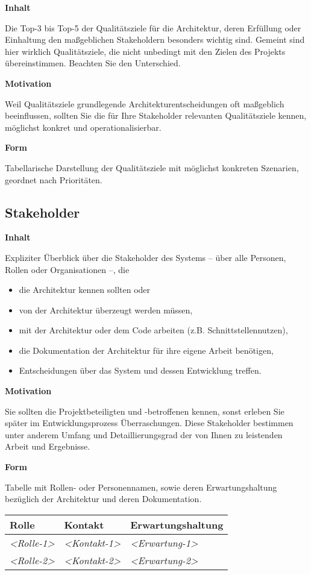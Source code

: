 \textbf{Inhalt}

Die Top-3 bis Top-5 der Qualitätsziele für die Architektur, deren
Erfüllung oder Einhaltung den maßgeblichen Stakeholdern besonders
wichtig sind. Gemeint sind hier wirklich Qualitätsziele, die nicht
unbedingt mit den Zielen des Projekts übereinstimmen. Beachten Sie den
Unterschied.

\textbf{Motivation}

Weil Qualitätsziele grundlegende Architekturentscheidungen oft
maßgeblich beeinflussen, sollten Sie die für Ihre Stakeholder relevanten
Qualitätsziele kennen, möglichst konkret und operationalisierbar.

\textbf{Form}

Tabellarische Darstellung der Qualitätsziele mit möglichst konkreten
Szenarien, geordnet nach Prioritäten.

\hypertarget{stakeholder}{%
\subsection{Stakeholder}\label{stakeholder}}

\textbf{Inhalt}

Expliziter Überblick über die Stakeholder des Systems -- über alle
Personen, Rollen oder Organisationen --, die

\begin{itemize}
\tightlist
\item
  die Architektur kennen sollten oder
\item
  von der Architektur überzeugt werden müssen,
\item
  mit der Architektur oder dem Code arbeiten (z.B.
  Schnittstellennutzen),
\item
  die Dokumentation der Architektur für ihre eigene Arbeit benötigen,
\item
  Entscheidungen über das System und dessen Entwicklung treffen.
\end{itemize}

\textbf{Motivation}

Sie sollten die Projektbeteiligten und -betroffenen kennen, sonst
erleben Sie später im Entwicklungsprozess Überraschungen. Diese
Stakeholder bestimmen unter anderem Umfang und Detaillierungsgrad der
von Ihnen zu leistenden Arbeit und Ergebnisse.

\textbf{Form}

Tabelle mit Rollen- oder Personennamen, sowie deren Erwartungshaltung
bezüglich der Architektur und deren Dokumentation.

\begin{longtable}[]{@{}lll@{}}
\toprule
Rolle & Kontakt & Erwartungshaltung\tabularnewline
\midrule
\endhead
\emph{\textless Rolle-1\textgreater{}} &
\emph{\textless Kontakt-1\textgreater{}} &
\emph{\textless Erwartung-1\textgreater{}}\tabularnewline
\emph{\textless Rolle-2\textgreater{}} &
\emph{\textless Kontakt-2\textgreater{}} &
\emph{\textless Erwartung-2\textgreater{}}\tabularnewline
\bottomrule
\end{longtable}
